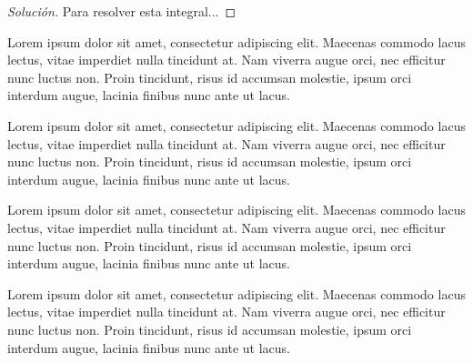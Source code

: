 \begin{proof}[Solución]
    Para resolver esta integral...
\end{proof}

\newpage

\begin{pncero}
    Lorem ipsum dolor sit amet, consectetur adipiscing elit. Maecenas commodo lacus lectus, vitae imperdiet nulla tincidunt at. Nam viverra augue orci, nec efficitur nunc luctus non. Proin tincidunt, risus id accumsan molestie, ipsum orci interdum augue, lacinia finibus nunc ante ut lacus.
\end{pncero}

\begin{pnuno}
    Lorem ipsum dolor sit amet, consectetur adipiscing elit. Maecenas commodo lacus lectus, vitae imperdiet nulla tincidunt at. Nam viverra augue orci, nec efficitur nunc luctus non. Proin tincidunt, risus id accumsan molestie, ipsum orci interdum augue, lacinia finibus nunc ante ut lacus.
\end{pnuno}

\begin{pndos}[Título]
    Lorem ipsum dolor sit amet, consectetur adipiscing elit. Maecenas commodo lacus lectus, vitae imperdiet nulla tincidunt at. Nam viverra augue orci, nec efficitur nunc luctus non. Proin tincidunt, risus id accumsan molestie, ipsum orci interdum augue, lacinia finibus nunc ante ut lacus.
\end{pndos}

\begin{pntres}
    Lorem ipsum dolor sit amet, consectetur adipiscing elit. Maecenas commodo lacus lectus, vitae imperdiet nulla tincidunt at. Nam viverra augue orci, nec efficitur nunc luctus non. Proin tincidunt, risus id accumsan molestie, ipsum orci interdum augue, lacinia finibus nunc ante ut lacus.
\end{pntres}